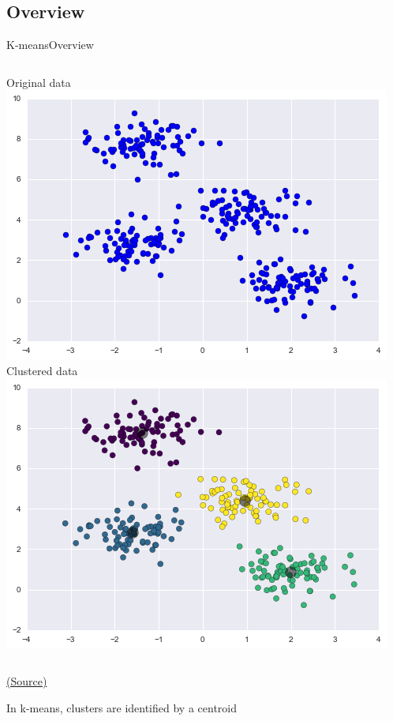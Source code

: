 \documentclass[10pt,compress]{beamer} %
\begin{document}
\subsection{Overview}
\begin{frame}{K-means}{Overview}
    \begin{columns}
       \centering Original data\\
		\includegraphics[width=\textwidth]{figs/kmeans-1.png}
       \centering Clustered data\\
		\includegraphics[width=\textwidth]{figs/kmeans-2.png}
    \end{columns}

    \centering \tiny{\href{https://jakevdp.github.io/PythonDataScienceHandbook/05.11-k-means.html}{(Source)}}

    \normalsize
    \begin{flushleft}
    In k-means, clusters are identified by a \alert{centroid}
    \end{flushleft}
\end{frame}
\end{document}
